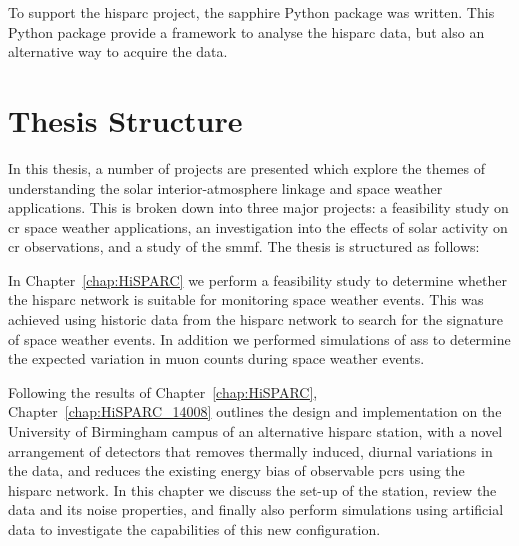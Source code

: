 To support the \gls{hisparc} project, the \gls{sapphire} Python package \citep{fokkema_hisparc_2012,fokkema_sapphire_2012} was written. This Python package provide a framework to analyse the \gls{hisparc} data, but also an alternative way to acquire the data.







\glsresetall 
{}
\section{Thesis Structure}

In this thesis, a number of projects are presented which explore the themes of understanding the solar interior-atmosphere linkage and space weather applications. This is broken down into three major projects: a feasibility study on \gls{cr} space weather applications, an investigation into the effects of solar activity on \gls{cr} observations, and a study of the \gls{smmf}. The thesis is structured as follows:

In Chapter~\ref{chap:HiSPARC} we perform a feasibility study to determine whether the \gls{hisparc} network is suitable for monitoring space weather events. This was achieved using historic data from the \gls{hisparc} network to search for the signature of space weather events. In addition we performed simulations of \glspl{as} to determine the expected variation in muon counts during space weather events. %

Following the results of Chapter~\ref{chap:HiSPARC}, Chapter~\ref{chap:HiSPARC_14008} outlines the design and implementation on the University of Birmingham campus of an alternative \gls{hisparc} station, with a novel arrangement of detectors that removes thermally induced, diurnal variations in the data, and reduces the existing energy bias of observable \glspl{pcr} using the \gls{hisparc} network. In this chapter we discuss the set-up of the station, review the data and its noise properties, and finally also perform simulations using artificial data to investigate the capabilities of this new configuration. %

